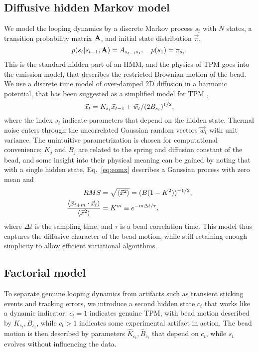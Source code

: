 \subsection{Diffusive hidden Markov model}
We model the looping dynamics by a discrete Markov process $s_t$ with
$N$ states, a transition probability matrix $\mathbf{A}$, and initial
state distribution $\vec{\pi}$,
\begin{equation}\label{eq:eoms}
  p(s_t|s_{t-1},\mathbf{A})=A_{s_{t-1}s_t},\quad p(s_1)=\pi_{s_t}.
\end{equation}
This is the standard hidden part of an HMM, and the physics of TPM
goes into the emission model, that describes the restricted Brownian
motion of the bead. We use a discrete time model of over-damped 2D
diffusion in a harmonic potential, that has been suggested as a
simplified model for TPM \cite{beausang2007b,lindner2013},
\begin{equation}\label{eq:eomx}
  \vec{x}_t=K_{s_t}\vec{x}_{t-1}+\vec{w}_t/(2B_{s_t})^{1/2},
\end{equation}
where the index $s_t$ indicate parameters that depend on the hidden
state.  Thermal noise enters through the uncorrelated Gaussian random
vectors $\vec{w}_t$ with unit variance. The unintuitive
parametrization is chosen for computational convenience; $K_j$ and
$B_j$ are related to the spring and diffusion constant of the bead,
and some insight into their physical meaning can be gained by noting
that with a single hidden state, Eq.~\ref{eq:eomx} describes a
Gaussian process with zero mean and
\begin{align}
RMS&=\sqrt{\left\langle \vec{x}^2\right\rangle}=(B(1-K^2))^{-1/2},\nonumber\\
\frac{\left\langle \vec{x}_{t+m}\cdot\vec{x}_t\right\rangle}{\left\langle \vec{x}^2\right\rangle}&
=K^m\equiv e^{-m\Delta t/\tau},\label{eq:1state}
\end{align}
where $\Delta t$ is the sampling time, and $\tau$ is a bead
correlation time.  This model thus captures the diffusive character of
the bead motion, while still retaining enough simplicity to allow
efficient variational algorithms
\cite{mackay1997,bishop2006}.

\subsection{Factorial model}
To separate genuine looping dynamics from artifacts such as transient
sticking events and tracking errors, we introduce a second hidden
state $c_t$ that works like a dynamic indicator: $c_t=1$ indicates
genuine TPM, with bead motion described by $K_{s_t},B_{s_t}$, while
$c_t>1$ indicates some experimental artifact in action. The bead
motion is then described by parameters $\hat K_{c_t},\hat B_{c_t}$
that depend on $c_t$, while $s_t$ evolves without influencing the
data. 

